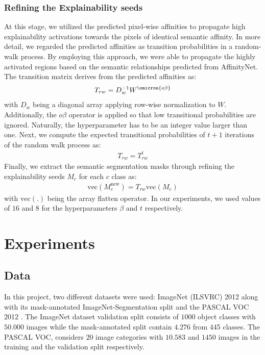 \documentclass{article}
\begin{document}
\subsubsection{Refining the Explainability seeds}
At this stage, we utilized the predicted pixel-wise affinities to propagate high explainability activations towards the pixels of identical semantic affinity. In more detail, we regarded the predicted affinities as transition probabilities in a random-walk process. By employing this approach, we were able to propagate the highly activated regions based on the semantic relationships predicted from AffinityNet. The transition matrix derives from the predicted affinities as: 
\begin{align*}
\label{eq:dropweight}
T_{rw}=D_w^{-1}W^\omicron{o\beta}
\end{align*}
with $D_w$ being a diagonal array applying row-wise normalization to $W$. Additionally, the $o\beta$ operator is applied so that low transitional probabilities are ignored. Naturally, the \byta hyperparameter has to be an integer value larger than one. Next, we compute the expected transitional probabilities of $t+1$ iterations of the random walk process as:
\begin{align*}
\label{eq:dropweight}
T_{rw}=T_{rw}^t
\end{align*}
Finally, we extract the semantic segmentation masks through refining the explainability seeds $M_c$ for each $c$ class as:
\begin{align*}
\label{eq:dropweight}
\text{vec}(M_c^\text{new})=T_{rw}\text{vec}(M_c)
\end{align*}
with $\text{vec}(.)$ being the array flatten operator. In our experiments, we used values of $16$ and $8$ for the hyperparameters $\beta$ and $t$ respectively.


\section{Experiments}

\subsection{Data}

In this project, two different datasets were used: ImageNet \cite{russakovsky2015ImageNet} (ILSVRC) 2012 along with its mask-annotated ImageNet-Segmentation \cite{imagenet-seg} split and the PASCAL VOC 2012 \cite{Everingham15}. The ImageNet dataset validation split consists of $1000$ object classes with $50.000$ images while the mask-annotated split contain $4.276$ from 445 classes. The PASCAL VOC, considers $20$ image categories with $10.583$ and $1450$ images in the training and the validation split respectively.
\end{document}
